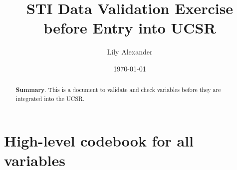 \documentclass{article}
\begin{document}
\title{STI Data Validation Exercise before Entry into UCSR}\author{
Lily Alexander
}

\date{
\bigskip
\today
}

\maketitle

\begin{abstract}
\textbf{Summary}. This is a document to validate and check variables before they are integrated into the UCSR.
\end{abstract}

\section{High-level codebook for all variables}
\end{document}
